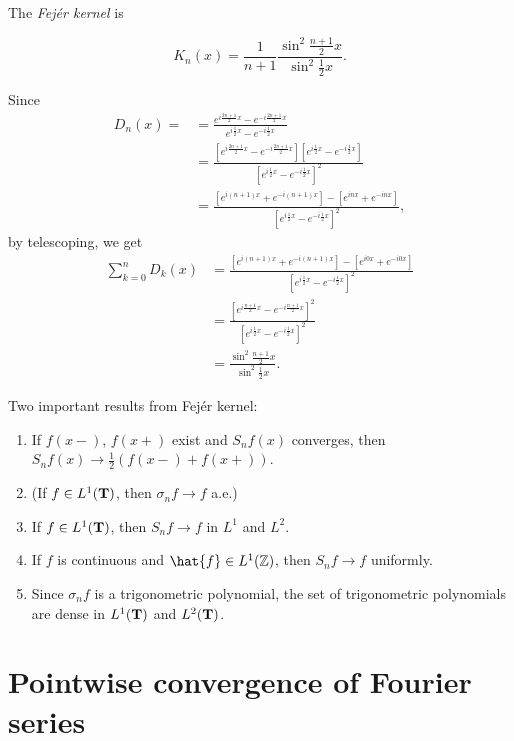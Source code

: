 \documentclass{../../large}
\begin{document}
\begin{prb}
The \emph{Fej\'er kernel} is

\begin{parts}
\item
\[K_n(x)=\frac1{n+1}\frac{\sin^2\frac{n+1}2x}{\sin^2\frac12x}.\]
\end{parts}
\end{prb}
\begin{pf}
Since
\begin{align*}
D_n(x)=
&=\frac{e^{i\frac{2n+1}2x}-e^{-i\frac{2n+1}2x}}{e^{i\frac12x}-e^{-i\frac12x}}\\
&=\frac{[e^{i\frac{2n+1}2x}-e^{-i\frac{2n+1}2x}][e^{i\frac12x}-e^{-i\frac12x}]}{[e^{i\frac12x}-e^{-i\frac12x}]^2}\\
&=\frac{[e^{i(n+1)x}+e^{-i(n+1)x}]-[e^{inx}+e^{-inx}]}{[e^{i\frac12x}-e^{-i\frac12x}]^2},
\end{align*}
by telescoping, we get
\begin{align*}
\sum_{k=0}^nD_k(x)
&=\frac{[e^{i(n+1)x}+e^{-i(n+1)x}]-[e^{i0x}+e^{-i0x}]}{[e^{i\frac12x}-e^{-i\frac12x}]^2}\\
&=\frac{[e^{i\frac{n+1}2x}-e^{-i\frac{n+1}2x}]^2}{[e^{i\frac12x}-e^{-i\frac12x}]^2}\\
&=\frac{\sin^2\frac{n+1}2x}{\sin^2\frac12x}.
\end{align*}
\end{pf}

Two important results from Fej\'er kernel:
\begin{enumerate}
\item If $f(x-)$, $f(x+)$ exist and $S_nf(x)$ converges, then $S_nf(x)\to\frac12(f(x-)+f(x+))$.
\item (If $f\in L^1(\mathbf{T})$, then $\sigma_nf\to f$ a.e.)

\item If $f\in L^1(\mathbf{T})$, then $S_nf\to f$ in $L^1$ and $L^2$.
\item If $f$ is continuous and $\hat{f}\in L^1(\Z)$, then $S_nf\to f$ uniformly.
\item Since $\sigma_nf$ is a trigonometric polynomial, the set of trigonometric polynomials are dense in $L^1(\mathbf{T})$ and $L^2(\mathbf{T})$.
\end{enumerate}



\section{Pointwise convergence of Fourier series}
\end{document}

